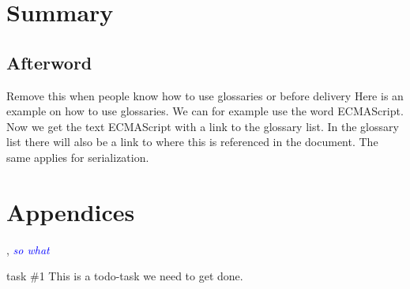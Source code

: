 \documentclass[BSP,english,oneside]{classes/gucthesis}
\newcommand{\comment}[1]{\textcolor{blue}{\emph{#1}}}
\newcommand{\todo}[1]{{\color{green}#1}}
\begin{document}
\part{Summary}

	\chapter{Afterword}
		\label{chap:afterword}
		


\todo{Remove this when people know how to use glossaries or before delivery}
Here is an example on how to use glossaries. We can for example use the word
\gls{ECMAScript}. Now we get the text ECMAScript with a link to the glossary
list. In the glossary list there will also be a link to where this is 
referenced in the document. The same applies for \gls{serialization}.






\printnoidxglossary[sort=word]


\part{Appendices}

\appendix %







\GUC, 
\comment{so what}

\todo{task \#1}
This is a todo-task we need to get done.
\end{document}
